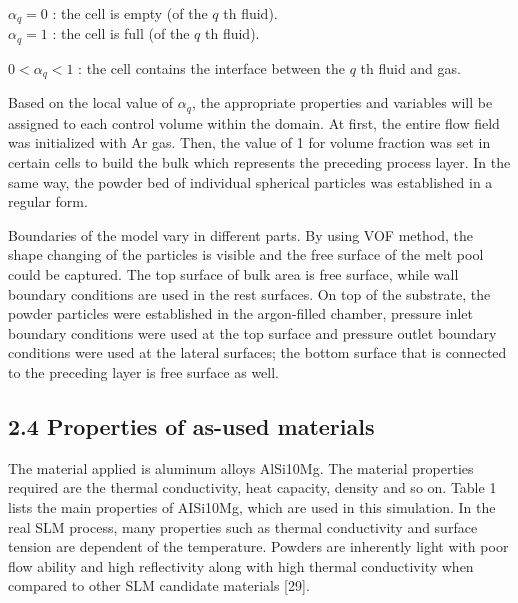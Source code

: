 \documentclass[10pt]{article}
\begin{document}
$\alpha_{q}=0$ : the cell is empty (of the $q$ th fluid).\\
$\alpha_{q}=1$ : the cell is full (of the $q$ th fluid).

$0<\alpha_{q}<1$ : the cell contains the interface between the $q$ th fluid and gas.

Based on the local value of $\alpha_{q}$, the appropriate properties and variables will be assigned to each control volume within the domain. At first, the entire flow field was initialized with Ar gas. Then, the value of 1 for volume fraction was set in certain cells to build the bulk which represents the preceding process layer. In the same way, the powder bed of individual spherical particles was established in a regular form.

Boundaries of the model vary in different parts. By using VOF method, the shape changing of the particles is visible and the free surface of the melt pool could be captured. The top surface of bulk area is free surface, while wall boundary conditions are used in the rest surfaces. On top of the substrate, the powder particles were established in the argon-filled chamber, pressure inlet boundary conditions were used at the top surface and pressure outlet boundary conditions were used at the lateral surfaces; the bottom surface that is connected to the preceding layer is free surface as well.

\subsection*{2.4 Properties of as-used materials}
The material applied is aluminum alloys AlSi10Mg. The material properties required are the thermal conductivity, heat capacity, density and so on. Table 1 lists the main properties of AISi10Mg, which are used in this simulation. In the real SLM process, many properties such as thermal conductivity and surface tension are dependent of the temperature. Powders are inherently light with poor flow ability and high reflectivity along with high thermal conductivity when compared to other SLM candidate materials [29].
\end{document}
